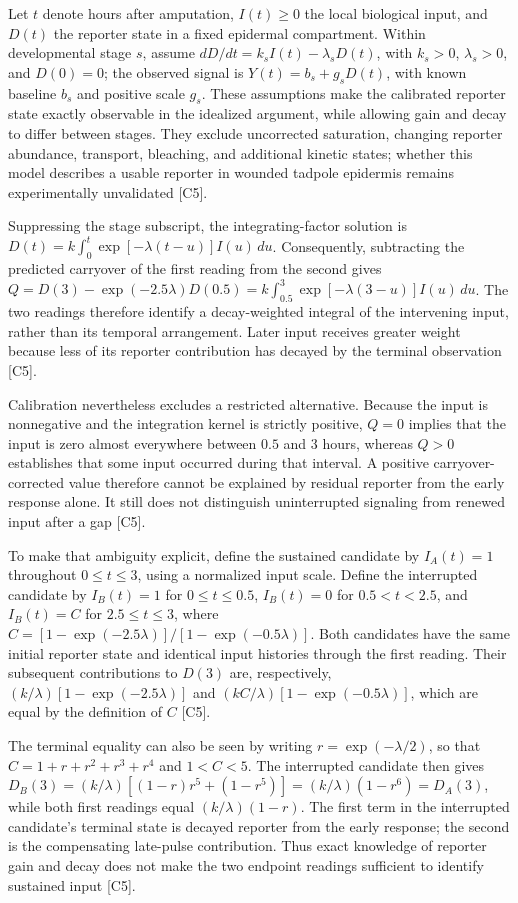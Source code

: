 \documentclass[11pt]{article}
\begin{document}
Let $t$ denote hours after amputation, $I(t)\geq 0$ the local biological input, and $D(t)$ the reporter state in a fixed epidermal compartment. Within developmental stage $s$, assume $dD/dt=k_sI(t)-\lambda_sD(t)$, with $k_s>0$, $\lambda_s>0$, and $D(0)=0$; the observed signal is $Y(t)=b_s+g_sD(t)$, with known baseline $b_s$ and positive scale $g_s$. These assumptions make the calibrated reporter state exactly observable in the idealized argument, while allowing gain and decay to differ between stages. They exclude uncorrected saturation, changing reporter abundance, transport, bleaching, and additional kinetic states; whether this model describes a usable reporter in wounded tadpole epidermis remains experimentally unvalidated [C5].

Suppressing the stage subscript, the integrating-factor solution is $D(t)=k\int_0^t\exp[-\lambda(t-u)]I(u)\,du$. Consequently, subtracting the predicted carryover of the first reading from the second gives $Q=D(3)-\exp(-2.5\lambda)D(0.5)=k\int_{0.5}^{3}\exp[-\lambda(3-u)]I(u)\,du$. The two readings therefore identify a decay-weighted integral of the intervening input, rather than its temporal arrangement. Later input receives greater weight because less of its reporter contribution has decayed by the terminal observation [C5].

Calibration nevertheless excludes a restricted alternative. Because the input is nonnegative and the integration kernel is strictly positive, $Q=0$ implies that the input is zero almost everywhere between $0.5$ and $3$ hours, whereas $Q>0$ establishes that some input occurred during that interval. A positive carryover-corrected value therefore cannot be explained by residual reporter from the early response alone. It still does not distinguish uninterrupted signaling from renewed input after a gap [C5].

To make that ambiguity explicit, define the sustained candidate by $I_A(t)=1$ throughout $0\leq t\leq3$, using a normalized input scale. Define the interrupted candidate by $I_B(t)=1$ for $0\leq t\leq0.5$, $I_B(t)=0$ for $0.5<t<2.5$, and $I_B(t)=C$ for $2.5\leq t\leq3$, where $C=[1-\exp(-2.5\lambda)]/[1-\exp(-0.5\lambda)]$. Both candidates have the same initial reporter state and identical input histories through the first reading. Their subsequent contributions to $D(3)$ are, respectively, $(k/\lambda)[1-\exp(-2.5\lambda)]$ and $(kC/\lambda)[1-\exp(-0.5\lambda)]$, which are equal by the definition of $C$ [C5].

The terminal equality can also be seen by writing $r=\exp(-\lambda/2)$, so that $C=1+r+r^2+r^3+r^4$ and $1<C<5$. The interrupted candidate then gives $D_B(3)=(k/\lambda)[(1-r)r^5+(1-r^5)]=(k/\lambda)(1-r^6)=D_A(3)$, while both first readings equal $(k/\lambda)(1-r)$. The first term in the interrupted candidate's terminal state is decayed reporter from the early response; the second is the compensating late-pulse contribution. Thus exact knowledge of reporter gain and decay does not make the two endpoint readings sufficient to identify sustained input [C5].
\end{document}
